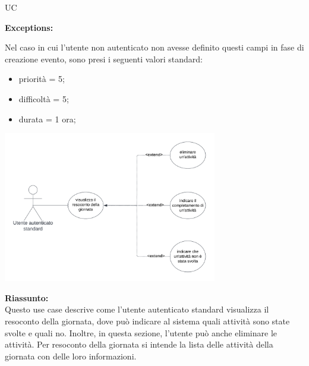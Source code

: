 \begin{listaPersonale}{UC}
\begin{listaPersonale2} [UC] {}
        \textbf{Exceptions:}
        \begin{enumerate}[label=\textbf{[exception \arabic{enumiii}]}, ref= \textbf{[exception \arabic{enumiii}]}]
             Nel caso in cui l'utente non autenticato non avesse definito questi campi in fase di creazione evento, sono presi i seguenti valori standard:
            \begin{itemize}
                \item priorità = 5;
                \item difficoltà = 5;
                \item durata = 1 ora;
            \end{itemize}
        \end{enumerate}
    \end{listaPersonale2}






    \newpage


    \begin{center}
        \includegraphics[width=0.7\textwidth]{img/Diagrammi/UseCases/ResocontoGiornata.png}
    \end{center}

    \textbf{Riassunto:} \\
    Questo use case descrive come l'utente autenticato standard visualizza il resoconto della giornata, dove può indicare al sistema quali attività sono state svolte e quali no. Inoltre, in questa sezione, l'utente può anche eliminare le attività. Per resoconto della giornata si intende la lista delle attività della giornata con delle loro informazioni.


\end{listaPersonale}
